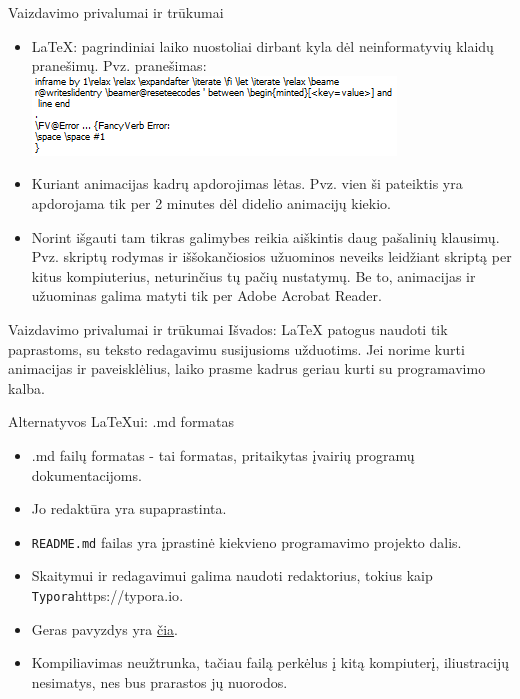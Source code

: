\documentclass{beamer}
\begin{document}
\begin{frame}[fragile]{Vaizdavimo privalumai ir trūkumai}
\begin{itemize}
\item LaTeX: pagrindiniai laiko nuostoliai dirbant kyla dėl neinformatyvių klaidų pranešimų.  Pvz. pranešimas:
\includegraphics[width =0.9 \textwidth]{pranesimas.png}
\item Kuriant animacijas kadrų apdorojimas lėtas. Pvz. vien ši pateiktis yra apdorojama tik per 2 minutes dėl didelio animacijų kiekio.
\item Norint išgauti tam tikras galimybes reikia aiškintis daug pašalinių klausimų. Pvz. skriptų rodymas ir iššokančiosios užuominos neveiks leidžiant skriptą per kitus kompiuterius, neturinčius tų pačių nustatymų. Be to, animacijas ir užuominas galima matyti tik per Adobe Acrobat Reader.
\end{itemize}
\end{frame}

\begin{frame}[fragile]{Vaizdavimo privalumai ir trūkumai}
Išvados: LaTeX patogus naudoti tik paprastoms, su teksto redagavimu susijusioms užduotims. Jei norime kurti animacijas ir paveisklėlius, laiko prasme kadrus geriau kurti su programavimo kalba. 
\end{frame}

\begin{frame}[fragile]{Alternatyvos LaTeXui: .md formatas}
\begin{itemize}
\item .md failų formatas - tai formatas, pritaikytas įvairių programų dokumentacijoms. 
\item Jo redaktūra yra supaprastinta. 
\item \texttt{README.md} failas yra įprastinė kiekvieno programavimo projekto dalis.
\item Skaitymui ir redagavimui galima naudoti redaktorius, tokius kaip \texttt{Typora}{https://typora.io}.
\item Geras pavyzdys yra \href{https://npm.pkg.github.com/Nimmel/Python}{čia}.
\item Kompiliavimas neužtrunka, tačiau failą perkėlus į kitą kompiuterį, iliustracijų nesimatys, nes bus prarastos jų nuorodos.
\end{itemize}
\end{frame}
\end{document}
